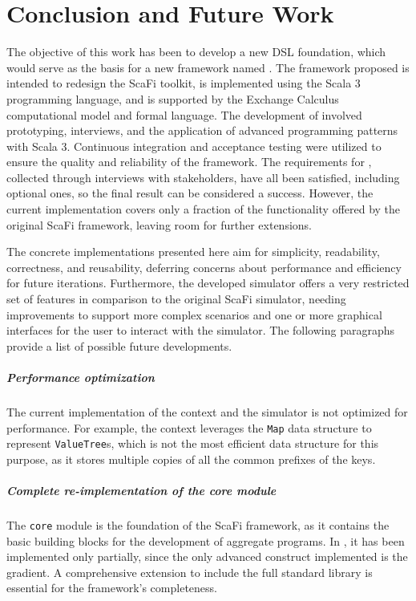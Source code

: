 \chapter{Conclusion and Future Work}
\label{chap:conclusion-and-future-work}

The objective of this work has been to develop a new \ac{DSL} foundation, which would serve as the basis for a new framework named \this.
%
The framework proposed is intended to redesign the ScaFi toolkit, is implemented using the Scala 3 programming language, and is supported by the Exchange Calculus computational model and formal language.
%
The development of \this involved prototyping, interviews, and the application of advanced programming patterns with Scala 3.
%
Continuous integration and acceptance testing were utilized to ensure the quality and reliability of the framework.
%
The requirements for \this, collected through interviews with stakeholders, have all been satisfied, including optional ones, so the final result can be considered a success.
%
However, the current implementation covers only a fraction of the functionality offered by the original ScaFi framework, leaving room for further extensions.

The concrete implementations presented here aim for simplicity, readability, correctness, and reusability, deferring concerns about performance and efficiency for future iterations.
%
Furthermore, the developed simulator offers a very restricted set of features in comparison to the original ScaFi simulator, needing improvements to support more complex scenarios and one or more graphical interfaces for the user to interact with the simulator.
%
The following paragraphs provide a list of possible future developments.

\paragraph{Performance optimization} The current implementation of the context and the simulator is not optimized for performance.
%
For example, the context leverages the \texttt{Map} data structure to represent \texttt{ValueTree}s, which is not the most efficient data structure for this purpose, as it stores multiple copies of all the common prefixes of the keys.

\paragraph{Complete re-implementation of the core module} The \texttt{core} module is the foundation of the ScaFi framework, as it contains the basic building blocks for the development of aggregate programs.
%
In \this, it has been implemented only partially, since the only advanced construct implemented is the gradient.
%
A comprehensive extension to include the full standard library is essential for the framework's completeness.

